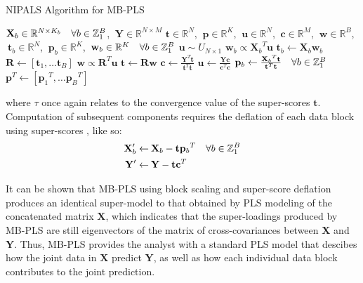 \begin{algorithm}[H]
\caption{NIPALS Algorithm for MB-PLS}
\label{algorithm.3.5}
\begin{algorithmic}[1]
\REQUIRE $\mathbf{X}_b \in \mathbb{R}^{N \times K_b}
          \quad \forall b \in \mathbb{Z}_{1}^{B}$,%
       $\:\mathbf{Y} \in \mathbb{R}^{N \times M}$
\ENSURE $\mathbf{t} \in \mathbb{R}^N$,%
      $\:\mathbf{p} \in \mathbb{R}^K$,%
      $\:\mathbf{u} \in \mathbb{R}^N$,%
      $\:\mathbf{c} \in \mathbb{R}^M$,%
      $\:\mathbf{w} \in \mathbb{R}^B$,%
      $\:\mathbf{t}_b \in \mathbb{R}^N$,%
      $\:\mathbf{p}_b \in \mathbb{R}^K$,%
      $\:\mathbf{w}_b \in \mathbb{R}^K
       \quad \forall b \in \mathbb{Z}_{1}^{B}$
\STATE $\mathbf{u} \sim U_{N \times 1}$ 
\REPEAT
    \STATE $\mathbf{w}_b \propto {\mathbf{X}_b}^T \mathbf{u}$
    \STATE $\mathbf{t}_b \gets \mathbf{X}_b \mathbf{w}_b$
  \ENDFOR
  \STATE $\mathbf{R} \gets [\mathbf{t}_1, \dots \mathbf{t}_B]$
  \STATE $\mathbf{w} \propto \mathbf{R}^T \mathbf{u}$
  \STATE $\mathbf{t} \gets \mathbf{R} \mathbf{w}$
  \STATE $\mathbf{c} \gets \tfrac{\mathbf{Y}^T \mathbf{t}}
                                 {\mathbf{t}^T \mathbf{t}}$
  \STATE $\mathbf{u} \gets \tfrac{\mathbf{Y} \mathbf{c}}
                                 {\mathbf{c}^T \mathbf{c}}$
\UNTIL{$\tau < \varepsilon$}
\STATE $\mathbf{p}_b \gets \tfrac{{\mathbf{X}_b}^T \mathbf{t}}
                                 {\mathbf{t}^T \mathbf{t}}
        \quad \forall b \in \mathbb{Z}_{1}^{B}$
\STATE $\mathbf{p}^T \gets [{\mathbf{p}_1}^T, \dots {\mathbf{p}_B}^T]$
\end{algorithmic}
\end{algorithm}

\begin{doublespace}
where $\tau$ once again relates to the convergence value of the super-scores
$\mathbf{t}$. Computation of subsequent components requires the deflation of
each data block using super-scores \cite{westerhuis:jchemo1997}, like so:
\begin{align}
\mathbf{X}_b' \gets& \: \mathbf{X}_b - \mathbf{t} {\mathbf{p}_b}^T
 \quad \forall b \in \mathbb{Z}_{1}^{B} \\
\mathbf{Y}' \gets& \: \mathbf{Y} - \mathbf{t} \mathbf{c}^T
\end{align}

It can be shown \cite{westerhuis:jchemo1998} that MB-PLS using block scaling
and super-score deflation produces an identical super-model to that obtained
by PLS modeling of the concatenated matrix $\mathbf{X}$, which indicates that
the super-loadings produced by MB-PLS are still eigenvectors of the matrix of
cross-covariances between $\mathbf{X}$ and $\mathbf{Y}$. Thus, MB-PLS provides
the analyst with a standard PLS model that descibes how the joint data in
$\mathbf{X}$ predict $\mathbf{Y}$, as well as how each individual data block
contributes to the joint prediction.
\end{doublespace}

